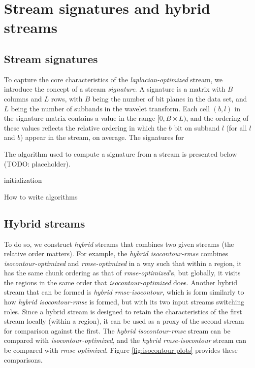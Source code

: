 \section{Stream signatures and hybrid streams}

\subsection{Stream signatures}
To capture the core characteristics of the \emph{laplacian-optimized} stream, we introduce the
concept of a stream \emph{signature}. A signature is a matrix with $B$ columns and $L$ rows, with
$B$ being the number of bit planes in the data set, and $L$ being the number of subbands in the
wavelet transform. Each cell $(b,l)$ in the signature matrix contains a value in the range
$[0,B\times L)$, and the ordering of these values reflects the relative ordering in which the $b$
bit on subband $l$ (for all $l$ and $b$) appear in the stream, on average. The signatures for

The algorithm used to compute a signature from a stream is presented below (TODO: placeholder).
\begin{algorithm}
  initialization\;
  \caption{How to write algorithms}
\end{algorithm}

\subsection{Hybrid streams}

To do so, we construct \emph{hybrid} streams that combines two given streams (the relative order
matters). For example, the \emph{hybrid isocontour-rmse} combines \emph{isocontour-optimized} and
\emph{rmse-optimized} in a way such that within a region, it has the same chunk ordering as that of
\emph{rmse-optimized}'s, but globally, it visits the regions in the same order that
\emph{isocontour-optimized} does. Another hybrid stream that can be formed is \emph{hybrid
rmse-isocontour}, which is form similarly to how \emph{hybrid isocontour-rmse} is formed, but with
its two input streams switching roles. Since a hybrid stream is designed to retain the
characteristics of the first stream locally (within a region), it can be used as a proxy of the
second stream for comparison against the first. The \emph{hybrid isocontour-rmse} stream can be
compared with \emph{isocontour-optimized}, and the \emph{hybrid rmse-isocontour} stream can be
compared with \emph{rmse-optimized}. Figure \ref{fig:isocontour-plots} provides these comparisons.

